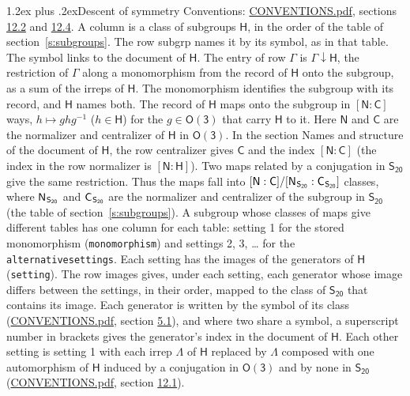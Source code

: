 \documentclass[10pt,a4paper]{article}
\makeatletter
\renewcommand\section{\@startsection{section}{1}{\z@}{-3ex plus -1ex minus -.2ex}%
  {1.2ex plus .2ex}{\normalfont\large\sffamily\bfseries\color{parttitle}}}
\numberwithin{equation}{section}
\newcommand{\grp}[1]{\mathsf{#1}}
\newcommand{\grpindex}[2]{[#1 : #2]}
\newcommand{\restr}[2]{#1\!\downarrow#2}
\newcommand{\hairsp}{\mkern1mu}
\makeatother
\begin{document}
\section{Descent of symmetry}\label{s:subduction}
Conventions: \href{../../CONVENTIONS.pdf}{CONVENTIONS.pdf}, sections \href{../../CONVENTIONS.pdf\#conv.12.2}{12.2} and \href{../../CONVENTIONS.pdf\#conv.12.4}{12.4}.
A column is a class of subgroups $\grp{H}$, in the order of the table of section~\ref{s:subgroups}. The row subgrp names it by its symbol, as in that table. The symbol links to the document of $\grp{H}$. The entry of row $\Gamma$ is $\restr{\Gamma}{\grp{H}}$, the restriction of $\Gamma$ along a monomorphism from the record of $\grp{H}$ onto the subgroup, as a sum of the irreps of $\grp{H}$. The monomorphism identifies the subgroup with its record, and $\grp{H}$ names both. \label{n:group.normalizer.o3}\label{n:group.centralizer.o3}The record of $\grp{H}$ maps onto the subgroup in $\grpindex{\grp{N}}{\grp{C}}$ ways, $h \mapsto g h g^{-1}$ ($h \in \grp{H}$) for the $g \in \grp{O(3)}$ that carry $\grp{H}$ to it. Here $\grp{N}$ and $\grp{C}$ are the normalizer and centralizer of $\grp{H}$ in \href{O3.pdf}{$\grp{O(3)}$}. In the section Names and structure of the document of $\grp{H}$, the row centralizer gives $\grp{C}$ and the index $\grpindex{\grp{N}}{\grp{C}}$ (the index in the row normalizer is $\grpindex{\grp{N}}{\grp{H}}$). Two maps related by a conjugation in $\grp{S_{20}}$ give the same restriction. Thus the maps fall into $\grpindex{\grp{N}}{\grp{C}}/\grpindex{\grp{N}_{\hairsp \grp{S_{20}}}}{\grp{C}_{\hairsp \grp{S_{20}}}}$ classes, where $\grp{N}_{\hairsp \grp{S_{20}}}$ and $\grp{C}_{\hairsp \grp{S_{20}}}$ are the normalizer and centralizer of the subgroup in $\grp{S_{20}}$ (the table of section~\ref{s:subgroups}). \label{n:head.setting}A subgroup whose classes of maps give different tables has one column for each table: setting 1 for the stored monomorphism (\texttt{monomorphism}) and settings 2, 3, \dots{} for the \texttt{alternativesettings}. Each setting has the images of the generators of $\grp{H}$ (\texttt{setting}). \label{n:head.images}The row images gives, under each setting, each generator whose image differs between the settings, in their order, mapped to the class of $\grp{S_{20}}$ that contains its image. Each generator is written by the symbol of its class (\href{../../CONVENTIONS.pdf}{CONVENTIONS.pdf}, section \href{../../CONVENTIONS.pdf\#conv.5.1}{5.1}), and where two share a symbol, a superscript number in brackets gives the generator's index in the document of $\grp{H}$. \label{n:irrep.Delta}Each other setting is setting 1 with each irrep $\Lambda$ of $\grp{H}$ replaced by $\Lambda$ composed with one automorphism of $\grp{H}$ induced by a conjugation in \href{O3.pdf}{$\grp{O(3)}$} and by none in $\grp{S_{20}}$ (\href{../../CONVENTIONS.pdf}{CONVENTIONS.pdf}, section \href{../../CONVENTIONS.pdf\#conv.12.1}{12.1}).
\end{document}
